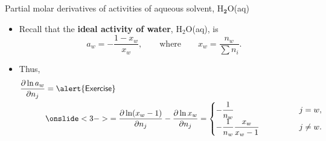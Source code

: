 \begin{frame}{Partial molar derivatives of activities of aqueous solvent, H$_{\boldsymbol{2}}$O(aq)}
%
\begin{itemize}
\item Recall that the {\bf ideal activity of water}, H$_{2}$O(aq), is
\[
a_{w}=-\frac{1-x_{w}}{x_{w}}, \qquad \text{where} \qquad 
x_{w}=\frac{n_{w}}{\sum n_{i}}.
\]
\hiddenpause
\item Thus, 
%
\begin{alignat*}{2}
\frac{\partial\ln a_{w}}{\partial n_{j}} & =\mathsf{\alert{Exercise}} \\
%
& \onslide<3->{= \frac{\partial\ln(x_{w}-1)}{\partial n_{j}}-\frac{\partial\ln x_{w}}{\partial n_{j}}=\begin{cases}
	-\dfrac{1}{n_{w}} & j=w,\\
	-\dfrac{1}{n_{w}}\dfrac{x_{w}}{x_{w}-1} \qquad \qquad & j\neq w.
\end{cases}}
\end{alignat*}
%
\end{itemize}

\end{frame}
%
%
%
%
%
%

